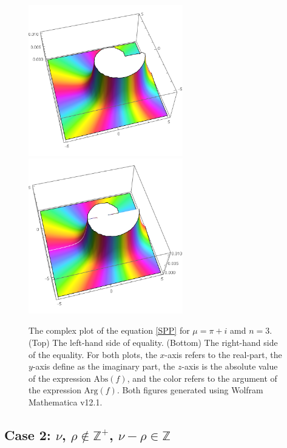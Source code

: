\begin{figure}[t]
 	\centering
 	\includegraphics[width=0.6\textwidth]{SPPLHSf.png}
 	 	\includegraphics[width=0.6\textwidth]{SPPRHSf.png}
 	\caption{The complex plot of the equation \eqref{SPP} for $\mu = \pi + i$ amd $n=3$. (Top) The left-hand side of equality. (Bottom) The right-hand side of the equality. For both plots, the $x$-axis refers to the real-part, the $y$-axis define as the imaginary part, the $z$-axis is the absolute value of the expression $\mathrm{Abs}(f)$, and the color refers to the argument of the expression $\mathrm{Arg}(f)$. Both figures generated using Wolfram Mathematica v12.1.}
 	\label{FSPP}
 \end{figure}


\subsection{Case 2: $\nu$, $\rho \not \in \mathbb{Z}^{+}$, $\nu-\rho \in \mathbb{Z}$}

